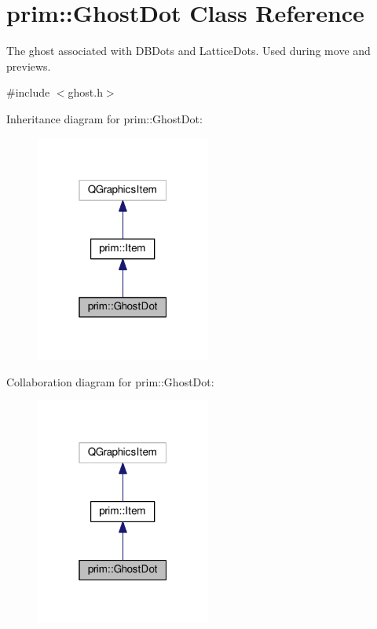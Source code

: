 \hypertarget{classprim_1_1GhostDot}{}\section{prim\+:\+:Ghost\+Dot Class Reference}
\label{classprim_1_1GhostDot}


The ghost associated with D\+B\+Dots and Lattice\+Dots. Used during move and previews.  




{\ttfamily \#include $<$ghost.\+h$>$}



Inheritance diagram for prim\+:\+:Ghost\+Dot\+:\nopagebreak
\begin{figure}[H]
\begin{center}
\leavevmode
\includegraphics[width=163pt]{classprim_1_1GhostDot__inherit__graph}
\end{center}
\end{figure}


Collaboration diagram for prim\+:\+:Ghost\+Dot\+:\nopagebreak
\begin{figure}[H]
\begin{center}
\leavevmode
\includegraphics[width=163pt]{classprim_1_1GhostDot__coll__graph}
\end{center}
\end{figure}
